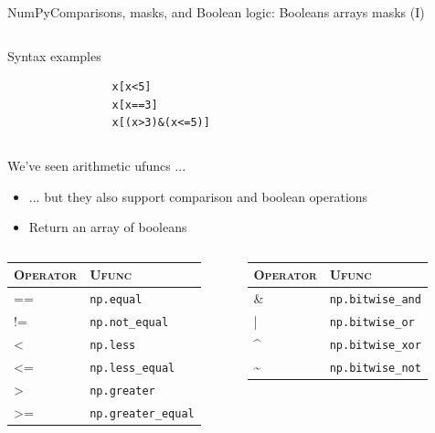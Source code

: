 \documentclass[10pt,compress]{beamer} %
\begin{document}
\begin{frame}[fragile]{NumPy}{Comparisons, masks, and Boolean logic: Booleans arrays masks (I)}
	
	\begin{columns}
		\begin{exampleblock}{\footnotesize{Syntax examples}}
		\vspace{-0.2cm} 
			\begin{lstlisting}
				x[x<5]
				x[x==3]
				x[(x>3)&(x<=5)]
			\end{lstlisting}
		\vspace{-0.2cm} 
		\end{exampleblock}
	\end{columns}

	\bigskip

	We've seen arithmetic ufuncs ...
	\begin{itemize}
		\item ... but they also support comparison and boolean operations
		\item Return an array of booleans
	\end{itemize}

	\footnotesize{
	\begin{columns}
 	   \column{0.5\textwidth}
       \begin{tabular}{ll}\hline
       	\textsc{Operator} &  \textsc{Ufunc}\\ \hline
       	== & \texttt{np.equal}  \\
       	!= & \texttt{np.not\_equal}  \\
       	<  & \texttt{np.less}  \\
       	<= & \texttt{np.less\_equal}  \\
       	>  & \texttt{np.greater}  \\
       	>= & \texttt{np.greater\_equal}\\\hline
    	\end{tabular}

 	   \column{0.5\textwidth}
        \begin{tabular}{ll}\hline
       	\textsc{Operator} &  \textsc{Ufunc}\\ \hline
       	\& & \texttt{np.bitwise\_and} \\
       	|  & \texttt{np.bitwise\_or}  \\
       	\textasciicircum & \texttt{np.bitwise\_xor} \\
       	\textasciitilde & \texttt{np.bitwise\_not} \\\hline
    	\end{tabular}
	\end{columns}
	}
\end{frame}
\end{document}
